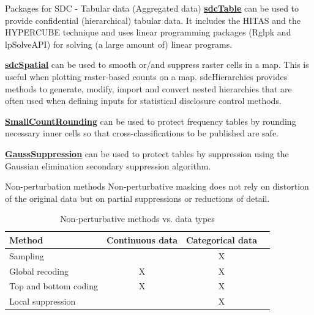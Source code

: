 \documentclass[
	11pt, %
]{beamer}
\begin{document}
\begin{frame}{Packages for SDC - Tabular data (Aggregated data)}
\label{packages-for-sdc---tabular-data-aggregated-data}
\href{https://cran.r-project.org/web/packages/sdcTable/index.html}{\color{blue}\underline{\textbf{sdcTable}}}
can be used to provide confidential (hierarchical) tabular data. It
includes the HITAS and the HYPERCUBE technique and uses linear
programming packages (Rglpk and lpSolveAPI) for solving (a large amount
of) linear programs.

\href{https://cran.r-project.org/web/packages/sdcSpatial/index.html}{\color{blue}\underline{\textbf{sdcSpatial}}}
can be used to smooth or/and suppress raster cells in a map. This is
useful when plotting raster-based counts on a map. sdcHierarchies
provides methods to generate, modify, import and convert nested
hierarchies that are often used when defining inputs for statistical
disclosure control methods.

\href{https://cran.r-project.org/web/packages/SmallCountRounding/index.html}{\color{blue}\underline{\textbf{SmallCountRounding}}}
can be used to protect frequency tables by rounding necessary inner
cells so that cross-classifications to be published are safe.

\href{https://cran.r-project.org/web/packages/GaussSuppression/index.html}{\color{blue}\underline{\textbf{GaussSuppression}}}
can be used to protect tables by suppression using the Gaussian
elimination secondary suppression algorithm.
\end{frame}

\begin{frame}{Non-perturbation methods}
\label{non-perturbation-methods}
Non-perturbative masking does not rely on distortion of the original
data but on partial suppressions or reductions of detail.

\begin{table}[ht]   
\centering  
\begin{tabular}[t]{lccc}    
\toprule    
 Method & Continuous data & Categorical data&\\ 
\midrule    
 Sampling  & & X &\\    
 Global recoding & X & X &\\    
 Top and bottom coding& X & X &\\   
 Local suppression & & X &\\    
\bottomrule 
\end{tabular}   
\caption{Non-perturbative methods vs. data types}   
\end{table}
\end{frame}
\end{document}
